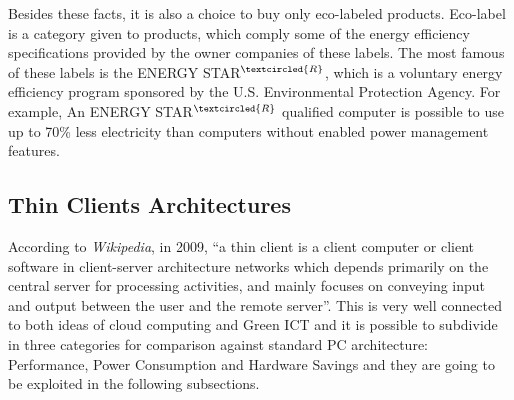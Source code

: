         Besides these facts, it is also a choice to buy only eco-labeled products. Eco-label is a category given to products, which comply some of the energy efficiency specifications provided by the owner companies of these labels. The most famous of these labels is the ENERGY STAR$^{\textcircled {\scriptsize R}}$, which is a voluntary energy efficiency program sponsored by the U.S. Environmental Protection Agency. For example, An ENERGY STAR$^{\textcircled {\scriptsize R}}$ qualified computer is possible to use up to 70\% less electricity than computers without enabled power management features.
            
        \subsection{Thin Clients Architectures} \label{sec2:thin_clients}
            According to \emph{Wikipedia}, in 2009, ``a thin client is a client computer or client software in client-server architecture networks which depends primarily on the central server for processing activities, and mainly focuses on conveying input and output between the user and the remote server''. This is very well connected to both ideas of cloud computing and Green ICT and it is possible to subdivide in three categories for comparison against standard PC architecture: Performance, Power Consumption and Hardware Savings and they are going to be exploited in the following subsections.
            
